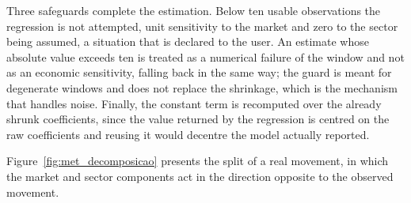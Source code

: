 Three safeguards complete the estimation. Below ten usable observations the regression is not
attempted, unit sensitivity to the market and zero to the sector being assumed, a situation that is
declared to the user. An estimate whose absolute value exceeds ten is treated as a numerical
failure of the window and not as an economic sensitivity, falling back in the same way; the guard
is meant for degenerate windows and does not replace the shrinkage, which is the mechanism that
handles noise. Finally, the constant term is recomputed over the already shrunk coefficients, since
the value returned by the regression is centred on the raw coefficients and reusing it would
decentre the model actually reported.

Figure~\ref{fig:met_decomposicao} presents the split of a real movement, in which the market and
sector components act in the direction opposite to the observed movement.

